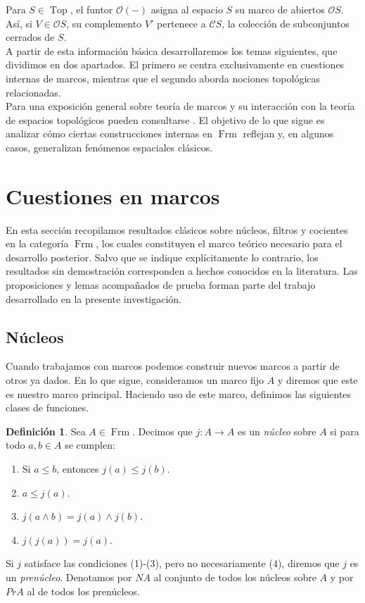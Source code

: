 \documentclass[11pt]{amsart}
\DeclareMathOperator{\Frm}{Frm}
\DeclareMathOperator{\Top}{Top}
\theoremstyle{plain}
\theoremstyle{definition}
\newtheorem{dfn}[thm]{Definición}
\begin{document}
Para $S\in\Top$, el funtor $\mathcal{O}(-)$ asigna al espacio $S$ su marco de abiertos $\mathcal{O}S$.
Así, si $V\in \mathcal{O}S$, su complemento $V'$ pertenece a $\mathcal{C}S$, la colección de subconjuntos cerrados de $S$.\\

A partir de esta información básica desarrollaremos los temas siguientes, que dividimos en dos apartados.
El primero se centra exclusivamente en cuestiones internas de marcos, mientras que el segundo aborda nociones topológicas 
relacionadas.\\

Para una exposición general sobre teoría de marcos y su interacción con la teoría de espacios topológicos
pueden consultarse \cite{Johnstone82,PicadoPultr,picado2021separation}. El objetivo de lo que sigue es analizar cómo ciertas construcciones internas en $\Frm$
reflejan y, en algunos casos, generalizan fenómenos espaciales clásicos.

\section{Cuestiones en marcos}
En esta sección recopilamos resultados clásicos sobre núcleos, filtros y cocientes en la categoría $\Frm$, los cuales constituyen el 
marco teórico necesario para el desarrollo posterior. Salvo que se indique explícitamente lo contrario, los resultados sin demostración 
corresponden a hechos conocidos en la literatura. Las proposiciones y lemas acompañados de prueba forman parte del trabajo desarrollado 
en la presente investigación.

\subsection{Núcleos}
Cuando trabajamos con marcos podemos construir nuevos marcos a partir de otros ya dados. En lo que sigue, consideramos un marco fijo $A$
y diremos que este es nuestro marco principal. Haciendo uso de este marco, definimos las siguientes clases de funciones.

\begin{dfn}\label{nucleo}
Sea $A\in \Frm$. Decimos que $j\colon A\to A$ es un \emph{núcleo} sobre $A$ si para todo $a, b\in A$ se cumplen:
\begin{enumerate}
\item Si $a\leq b$, entonces $j(a)\leq j(b)$.
\item $a\leq j(a)$.
\item $j(a\wedge b)=j(a)\wedge j(b)$.
\item $j(j(a))=j(a)$.
\end{enumerate}
\end{dfn}
Si $j$ satisface las condiciones (1)-(3), pero no necesariamente (4), diremos que $j$ es un \emph{prenúcleo}. 
Denotamos por $NA$ al conjunto de todos los núcleos sobre $A$ y por $PrA$ al de todos los prenúcleos.\\
\end{document}
